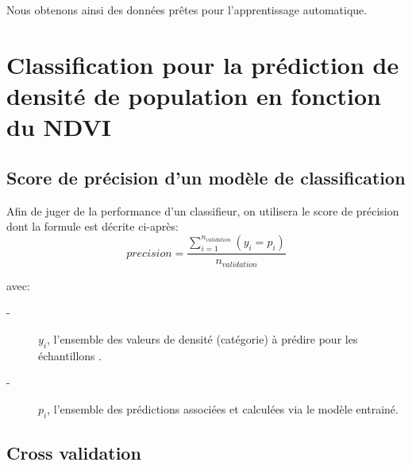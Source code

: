 \documentclass{book}
\begin{document}
Nous obtenons ainsi des données prêtes pour l'apprentissage automatique.


\chapter{Classification pour la prédiction de densité de population en fonction du NDVI}
 
\section{Score de précision d'un modèle de classification}

Afin de juger de la performance d'un classifieur, on utilisera le score de précision dont la formule est décrite ci-après:\\

\begin{equation}
precision = \frac{\sum \limits_{\underset{}{i=1}}^{n_{validation}} (y_i = p_i)}{n_{validation}}
\end{equation}

avec:
\begin{description}
\item[-] ${y_i}$, l'ensemble des valeurs de densité (catégorie) à prédire pour les échantillons .
\item[-] ${p_i}$, l'ensemble des prédictions associées et calculées via le modèle entrainé.
\end{description}

\section{Cross validation}
\end{document}
